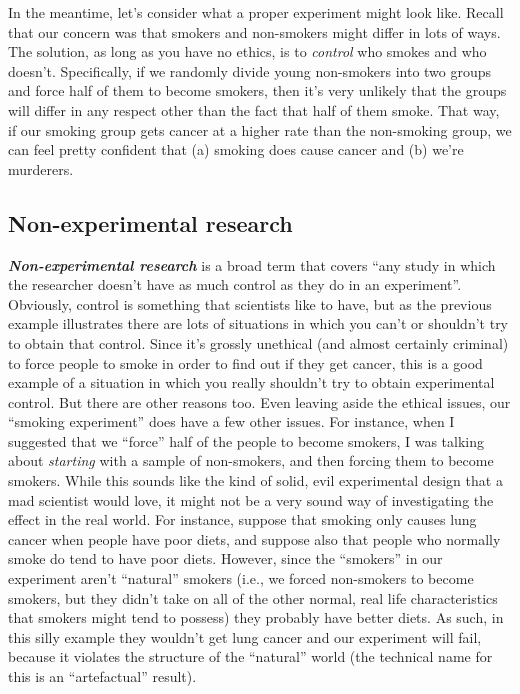 \documentclass[
]{book}
\begin{document}
In the meantime, let's consider what a proper experiment might look like. Recall that our concern was that smokers and non-smokers might differ in lots of ways. The solution, as long as you have no ethics, is to \emph{control} who smokes and who doesn't. Specifically, if we randomly divide young non-smokers into two groups and force half of them to become smokers, then it's very unlikely that the groups will differ in any respect other than the fact that half of them smoke. That way, if our smoking group gets cancer at a higher rate than the non-smoking group, we can feel pretty confident that (a) smoking does cause cancer and (b) we're murderers.

\hypertarget{non-experimental-research}{%
\subsection{Non-experimental research}\label{non-experimental-research}}

\textbf{\emph{Non-experimental research}} is a broad term that covers ``any study in which the researcher doesn't have as much control as they do in an experiment''. Obviously, control is something that scientists like to have, but as the previous example illustrates there are lots of situations in which you can't or shouldn't try to obtain that control. Since it's grossly unethical (and almost certainly criminal) to force people to smoke in order to find out if they get cancer, this is a good example of a situation in which you really shouldn't try to obtain experimental control. But there are other reasons too. Even leaving aside the ethical issues, our ``smoking experiment'' does have a few other issues. For instance, when I suggested that we ``force'' half of the people to become smokers, I was talking about \emph{starting} with a sample of non-smokers, and then forcing them to become smokers. While this sounds like the kind of solid, evil experimental design that a mad scientist would love, it might not be a very sound way of investigating the effect in the real world. For instance, suppose that smoking only causes lung cancer when people have poor diets, and suppose also that people who normally smoke do tend to have poor diets. However, since the ``smokers'' in our experiment aren't ``natural'' smokers (i.e., we forced non-smokers to become smokers, but they didn't take on all of the other normal, real life characteristics that smokers might tend to possess) they probably have better diets. As such, in this silly example they wouldn't get lung cancer and our experiment will fail, because it violates the structure of the ``natural'' world (the technical name for this is an ``artefactual'' result).
\end{document}
